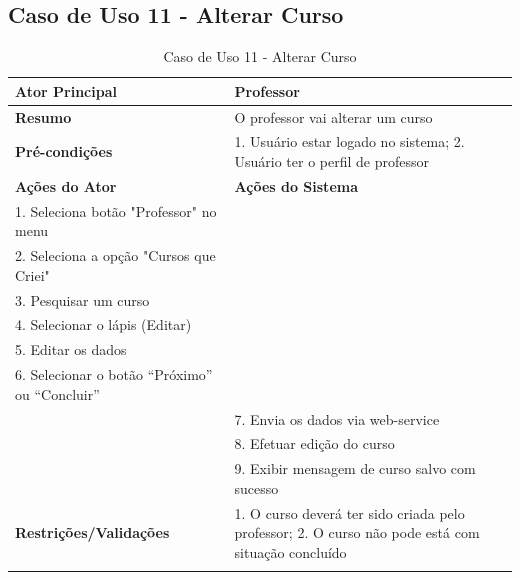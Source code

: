 \subsection{Caso de Uso 11 - Alterar Curso}
\label{sc:case11}
\begin{center}
\begin{longtable}{p{8cm}|p{8cm}}
    \hline
    \textbf{Ator Principal} & Professor \\
    \hline
    \textbf{Resumo} & O professor vai alterar um curso \\
    \hline
    \textbf{Pr\'{e}-condi\c{c}\~{o}es} & 1. Usuário estar logado no sistema; 2. Usuário ter o perfil de professor \\
    \hline
    \textbf{A\c{c}\~{o}es do Ator} & \textbf{A\c{c}\~{o}es do Sistema} \\
    \hline
    1. Seleciona botão "Professor" no menu \\
    \hline
    2. Seleciona a opção "Cursos que Criei" \\
	\hline
    3. Pesquisar um curso \\
	\hline
    4. Selecionar o lápis (Editar) \\
	\hline
    5. Editar os dados \\
	\hline
    6. Selecionar o botão “Próximo” ou “Concluir” \\
    \hline
    & 7. Envia os dados via web-service \\
	\hline
    & 8. Efetuar edição do curso \\
	\hline
    & 9. Exibir mensagem de curso salvo com sucesso \\
    \hline
    \hline
    \textbf{Restri\c{c}\~{o}es/Valida\c{c}\~{o}es} & 1. O curso deverá ter sido criada pelo professor; 2. O curso não pode está com situação concluído \\
\hline
\caption{Caso de Uso 11 - Alterar Curso}
\end{longtable}
\end{center}

